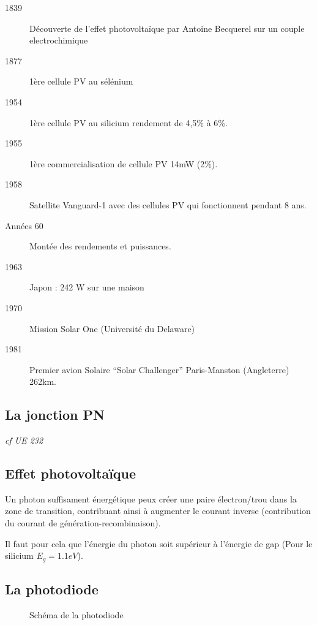 \documentclass[main.tex]{subfiles}
\begin{document}
\begin{description}
\item[1839] Découverte de l'effet photovoltaïque par Antoine Becquerel sur un couple electrochimique
\item[1877] 1ère cellule PV au sélénium
\item[1954] 1ère cellule PV au silicium rendement de 4,5\% à 6\%.
\item[1955] 1ère commercialisation de cellule PV 14mW (2\%).
\item[1958] Satellite Vanguard-1 avec des cellules PV qui fonctionnent pendant 8 ans.
\item[Années 60] Montée des rendements et puissances.
\item[1963] Japon : 242 W sur une maison
\item[1970] Mission Solar One (Université du Delaware)
\item[1981] Premier avion Solaire ``Solar Challenger'' Paris-Manston (Angleterre) 262km.
\end{description}

\subsection{La jonction PN}
\emph{cf UE 232}
\subsection{Effet photovoltaïque}

Un photon suffisament énergétique peux créer une paire électron/trou dans la zone de transition, contribuant ainsi à augmenter le courant inverse (contribution du courant de génération-recombinaison).

Il faut pour cela que l'énergie du photon soit supérieur à l'énergie de gap (Pour le silicium $E_g=1.1eV$).

\subsection{La photodiode}


\begin{figure}[H]
  \centering
  \caption{Schéma de la photodiode}
\end{figure}
\end{document}
